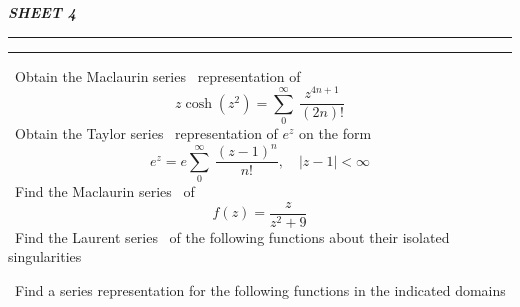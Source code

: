 \documentclass[12pt]{exam}
\newcommand{\modz}[0]{\left|z\right|}
\newcommand{\infsum}[1]{\sum_0^\infty\ #1}
\newcommand{\mac}[0]{Maclaurin series }
\newcommand{\tay}[0]{Taylor series }
\newcommand{\lau}[0]{Laurent series }
\begin{document}
\begin{center}
    \bfseries\itshape\Huge
    SHEET 4
\end{center}
\hrule\vspace{0.2em}\hrule
\vspace{1em}

\begin{questions}
\large
\question\ Obtain the \mac\ representation of \[
z\cosh(z^2) = \infsum{\frac{z^{4n+1}}{(2n)!}}
\]
\question\ Obtain the \tay\ representation of \(e^z\) on the form \[
    e^z = e \infsum{\frac{{(z-1)}^n}{n!}}, \quad |z - 1| < \infty
\]
\question\ Find the \mac\ of \[
f(z) = \frac{z}{z^2 + 9}
\]
\question\ Find the \lau\ of the following functions about their isolated singularities 

\vspace{1em}

\question\ Find a series representation for the following functions in the indicated domains
\end{questions}
\end{document}
